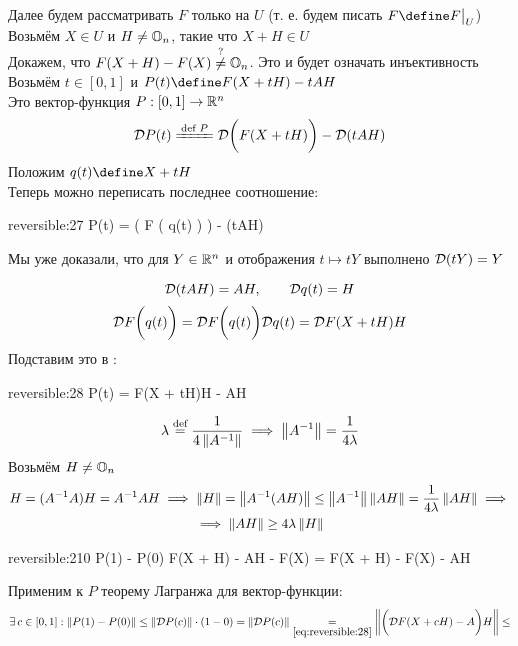 \begin{replacementproof}[Инъективность $ F $]
	\hfill \\
	 \\
	Далее будем рассматривать $ F $ только на $ U $ (т. е. будем писать $ F \define F\clamp{U} $) \\
	Возьмём $ X \in U $ и $ H \ne \mathbb{O}_{n} $, такие что $ X + H \in U $ \\
	Докажем, что $ F(X + H) - F(X) \stackrel?\ne \mathbb{O}_{n} $. Это и будет означать инъективность \\
	Возьмём $ t \in [0, 1] $ и $ P(t) \define F(X + tH) - tAH $ \\
	Это вектор-функция $ P : [0, 1] \to \mathbb{R}^n $
	$$ \mc{D}P(t) \bdefeq{P} \mc{D} \bigg( F(X + tH) \bigg) - \mc{D}(tAH) $$
	Положим $ q(t) \define X + tH $ \\
	Теперь можно переписать последнее соотношение:
	\begin{equ}{reversible:27}
		P(t) =  \bigg( F \big( q(t) \big) \bigg) - (tAH)
	\end{equ}
	\begin{remind}
		Мы уже доказали, что для $ Y \in \mathbb{R}^n $ и отображения $ t \mapsto tY $ выполнено $ \mathcal{D}(tY) = Y $
	\end{remind}
	$$ \mathcal{D}(tAH) = AH, \qquad \mathcal{D}q(t) = H $$
	$$ \mathcal{D}F \bigg( q(t) \bigg) = \mathcal{D}F \bigg( q(t) \bigg)\mathcal{D}q(t) = \mathcal{D}F(X + tH)H $$
	Подставим это в :
	\begin{equ}{reversible:28}
		P(t) = F(X + tH)H - AH
	\end{equ}
	$$ \lambda \stackrel{\text{def}}{=} \frac1{4\left\|{A^{-1}}\right\|} \implies \left\|{A^{-1}}\right\| = \frac1{4\lambda} $$
	Возьмём $ H \ne \mathbb{O}_{n} $
	\begin{multline}\lbl{reversible:29}
		H = (A^{-1}A)H = A^{-1}AH \implies \norm{H} = \norm{A^{-1}(AH)} \le \norm{A^{-1}}\norm{AH} = \frac1{4\lambda}\norm{AH} \implies \\
		\implies \norm{AH} \ge 4\lambda\norm{H}
	\end{multline}
	\begin{equ}{reversible:210}
		P(1) - P(0)  F(X + H) - AH - F(X) = F(X + H) - F(X) - AH
	\end{equ}
	Применим к $ P $ теорему Лагранжа для вектор-функции:
	\begin{multline}\lbl{reversible:211}
		\exist c \in [0, 1] : \norm{P(1) - P(0)} \le \norm{\mc{D}P(c)} \cdot (1 - 0) = \norm{\mc{D}P(c)} \underset{\eref{reversible:28}}= \norm{ \bigg( \mc{D}F(X + cH) - A \bigg)H} \le \\

\end{multline}
\end{replacementproof}
